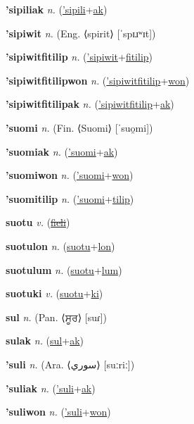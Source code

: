 \textbf{\hypertarget{'sipiliak}{'sipiliak}} \textit{n.} (\hyperlink{'sipili}{'sipili}+\allowbreak \hyperlink{ak}{ak})


\textbf{\hypertarget{'sipiwit}{'sipiwit}} \textit{n.} (Eng. ⟨spirit⟩ [ˈspɪɹʷɪt])


\textbf{\hypertarget{'sipiwitfitilip}{'sipiwitfitilip}} \textit{n.} (\hyperlink{'sipiwit}{'sipiwit}+\allowbreak \hyperlink{fitilip}{fitilip})


\textbf{\hypertarget{'sipiwitfitilipwon}{'sipiwitfitilipwon}} \textit{n.} (\hyperlink{'sipiwitfitilip}{'sipiwitfitilip}+\allowbreak \hyperlink{won}{won})


\textbf{\hypertarget{'sipiwitfitilipak}{'sipiwitfitilipak}} \textit{n.} (\hyperlink{'sipiwitfitilip}{'sipiwitfitilip}+\allowbreak \hyperlink{ak}{ak})


\textbf{\hypertarget{'suomi}{'suomi}} \textit{n.} (Fin. ⟨Suomi⟩ [ˈsuo̯mi])


\textbf{\hypertarget{'suomiak}{'suomiak}} \textit{n.} (\hyperlink{'suomi}{'suomi}+\allowbreak \hyperlink{ak}{ak})


\textbf{\hypertarget{'suomiwon}{'suomiwon}} \textit{n.} (\hyperlink{'suomi}{'suomi}+\allowbreak \hyperlink{won}{won})


\textbf{\hypertarget{'suomitilip}{'suomitilip}} \textit{n.} (\hyperlink{'suomi}{'suomi}+\allowbreak \hyperlink{tilip}{tilip})


\textbf{\hypertarget{suotu}{suotu}} \textit{v.} (\hyperlink{fieli}{\sout{fieli}})


\textbf{\hypertarget{suotulon}{suotulon}} \textit{n.} (\hyperlink{suotu}{suotu}+\allowbreak \hyperlink{lon}{lon})


\textbf{\hypertarget{suotulum}{suotulum}} \textit{n.} (\hyperlink{suotu}{suotu}+\allowbreak \hyperlink{lum}{lum})


\textbf{\hypertarget{suotuki}{suotuki}} \textit{v.} (\hyperlink{suotu}{suotu}+\allowbreak \hyperlink{ki}{ki})


\textbf{\hypertarget{sul}{sul}} \textit{n.} (Pan. ⟨{\gurmukhi{}ਸੂਰ}⟩ [suɾ])


\textbf{\hypertarget{sulak}{sulak}} \textit{n.} (\hyperlink{sul}{sul}+\allowbreak \hyperlink{ak}{ak})


\textbf{\hypertarget{'suli}{'suli}} \textit{n.} (Ara. ⟨{\arabics{}سوري‎}⟩ [suːriː])


\textbf{\hypertarget{'suliak}{'suliak}} \textit{n.} (\hyperlink{'suli}{'suli}+\allowbreak \hyperlink{ak}{ak})


\textbf{\hypertarget{'suliwon}{'suliwon}} \textit{n.} (\hyperlink{'suli}{'suli}+\allowbreak \hyperlink{won}{won})


